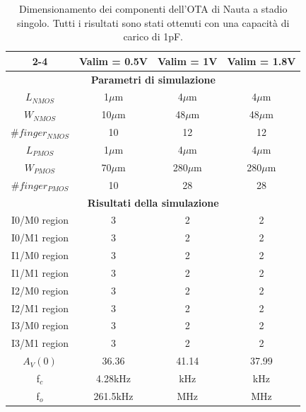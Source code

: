 \begin{table}[H]
    \centering
    \begin{tabular}{c|c|c|c|}
        \cline{2-4}
        & \textbf{Valim = 0.5V} & \textbf{Valim = 1V} & \textbf{Valim = 1.8V} \\ \hline
        \multicolumn{4}{|c|}{\textbf{Parametri di simulazione}} \\ \hline
        \multicolumn{1}{|c|}{\textbf{$L_{NMOS}$}} & 1$\mu$m & 4$\mu$m & 4$\mu$m \\ \hline
        \multicolumn{1}{|c|}{\textbf{$W_{NMOS}$}} & 10$\mu$m & 48$\mu$m & 48$\mu$m \\ \hline
        \multicolumn{1}{|c|}{\textbf{$\#finger_{NMOS}$}} & 10 & 12 & 12 \\ \hline
        \multicolumn{1}{|c|}{\textbf{$L_{PMOS}$}} & 1$\mu$m & 4$\mu$m & 4$\mu$m \\ \hline
        \multicolumn{1}{|c|}{\textbf{$W_{PMOS}$}} & 70$\mu$m & 280$\mu$m & 280$\mu$m \\ \hline
        \multicolumn{1}{|c|}{\textbf{$\#finger_{PMOS}$}} & 10 & 28 & 28 \\ \hline
        \multicolumn{4}{|c|}{\textbf{Risultati della simulazione}} \\ \hline
        \multicolumn{1}{|c|}{I0/M0 region} & 3 & 2 & 2 \\ \hline
        \multicolumn{1}{|c|}{I0/M1 region} & 3 & 2 & 2 \\ \hline
        \multicolumn{1}{|c|}{I1/M0 region} & 3 & 2 & 2 \\ \hline
        \multicolumn{1}{|c|}{I1/M1 region} & 3 & 2 & 2 \\ \hline
        \multicolumn{1}{|c|}{I2/M0 region} & 3 & 2 & 2 \\ \hline
        \multicolumn{1}{|c|}{I2/M1 region} & 3 & 2 & 2 \\ \hline
        \multicolumn{1}{|c|}{I3/M0 region} & 3 & 2 & 2 \\ \hline
        \multicolumn{1}{|c|}{I3/M1 region} & 3 & 2 & 2 \\ \hline
        \multicolumn{1}{|c|}{$A_V(0)$} & 36.36 & 41.14 & 37.99 \\ \hline
        \multicolumn{1}{|c|}{f$_c$} & 4.28kHz & kHz &  kHz \\ \hline
        \multicolumn{1}{|c|}{f$_o$} & 261.5kHz & MHz &  MHz \\ \hline
    \end{tabular}
    \caption{Dimensionamento dei componenti dell'OTA di Nauta a stadio singolo. Tutti i risultati sono stati ottenuti con una capacità di carico di 1pF.}
    \label{tab:component_sizing_nauta_single_stage}
\end{table}

